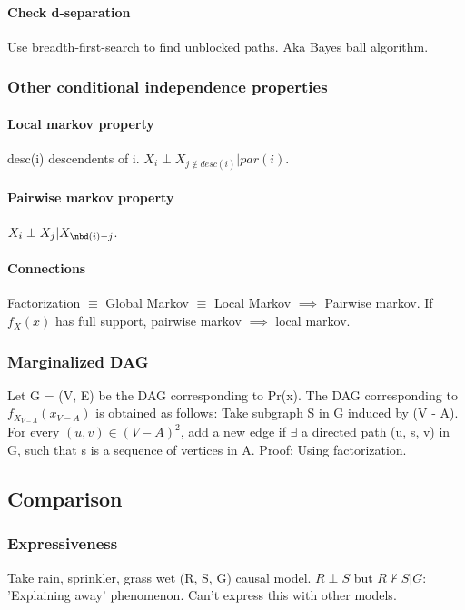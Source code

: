 \documentclass[oneside, article]{memoir}
\begin{document}
\paragraph*{Check d-separation}
Use breadth-first-search to find unblocked paths. Aka Bayes ball algorithm.

\subsubsection{Other conditional independence properties}
\paragraph*{Local markov property}
desc(i) \dfn descendents of i. $X_i \perp X_{j \notin desc(i)}| par(i)$.

\paragraph*{Pairwise markov property}
$X_i \perp X_j | X_{\nbd(i) - j}$.

\paragraph*{Connections}
Factorization $\equiv$ Global Markov $\equiv$ Local Markov $\implies$ Pairwise markov. If $f_X(x)$ has full support, pairwise markov $\implies$ local markov.

\subsubsection{Marginalized DAG}
Let G = (V, E) be the DAG corresponding to Pr(x). The DAG corresponding to $f_{X_{V-A}}(x_{V-A})$ is obtained as follows: Take subgraph S in G induced by (V - A). For every $(u, v) \in (V-A)^{2}$, add a new edge if $\exists$ a directed path (u, s, v) in G, such that s is a sequence of vertices in A. Proof: Using factorization.

\subsection{Comparison}
\subsubsection{Expressiveness}
Take rain, sprinkler, grass wet (R, S, G) causal model. $R \perp S$ but $R \nvdash S|G$: 'Explaining away' phenomenon. Can't express this with other models.
\end{document}
